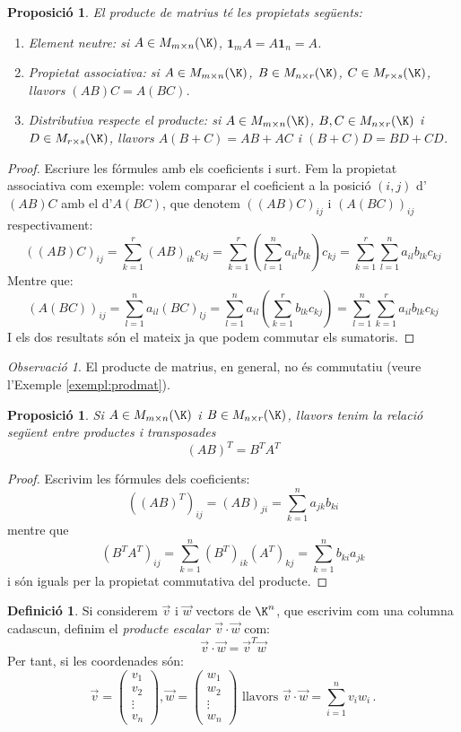 \documentclass[a4paper,12pt,twoside]{article}
\newcommand{\1}{\mathbf{1}}
\newcommand{\0}{\mathbf{0}}
\newtheorem{proposicio}[teorema]{Proposició}
\theoremstyle{definition}
\newtheorem{definicio}[teorema]{Definició}
\theoremstyle{remark}
\newtheorem{observacio}[teorema]{Observació}
\begin{document}
\begin{proposicio}
	El producte de matrius té les propietats següents:
	\begin{enumerate}[\rm (a)]
		\item Element neutre: si $A \in M_{m\times n}(\K)$, $\1_m A = A \1_n = A$.
		\item Propietat associativa: si $A \in M_{m\times n}(\K)$, $B \in M_{n\times r}(\K)$, $C \in M_{r\times s}(\K)$, llavors $(AB)C=A(BC)$.
		\item Distributiva respecte el producte: si $A \in M_{m\times n}(\K)$, $B, C \in M_{n\times r}(\K)$ i $D \in M_{r\times s}(\K)$, llavors $A(B+C)=AB+AC$ i $(B+C)D=BD+CD$.
	\end{enumerate}
\end{proposicio}
\begin{proof}
	Escriure les fórmules amb els coeficients i surt. Fem la propietat associativa com exemple: volem comparar el coeficient a la posició $(i,j)$ d'$(AB)C$ amb el d'$A(BC)$, que denotem $((AB)C)_{ij}$ i $(A(BC))_{ij}$ respectivament:
	$$
	((AB)C)_{ij}=\sum_{k=1}^r(AB)_{ik}c_{kj}=\sum_{k=1}^r(\sum_{l=1}^na_{il}b_{lk})c_{kj}=\sum_{k=1}^r\sum_{l=1}^na_{il}b_{lk}c_{kj}
	$$
	Mentre que:
	$$
	(A(BC))_{ij}=\sum_{l=1}^na_{il}(BC)_{lj}=\sum_{l=1}^na_{il}(\sum_{k=1}^rb_{lk}c_{kj})=\sum_{l=1}^n\sum_{k=1}^ra_{il}b_{lk}c_{kj}
	$$
	I els dos resultats són el mateix ja que podem commutar els sumatoris.
\end{proof}
\begin{observacio}
	El producte de matrius, en general, no és commutatiu (veure l'Exemple \ref{exempl:prodmat}).
\end{observacio}
\begin{proposicio}
	Si $A\in M_{m\times n}(\K)$ i $B\in M_{n\times r}(\K)$, llavors tenim la relació següent entre productes i transposades
	$$
	(AB)^T=B^T A^T
	$$
\end{proposicio}
\begin{proof}
	Escrivim les fórmules dels coeficients:
	$$
	((AB)^T)_{ij}=(AB)_{ji}=\sum_{k=1}^n a_{jk}b_{ki}
	$$
	mentre que
	$$
	(B^TA^T)_{ij}=\sum_{k=1}^n (B^T)_{ik}(A^T)_{kj}=\sum_{k=1}^n b_{ki}a_{jk}
	$$
	i són iguals per la propietat commutativa del producte.
\end{proof}
\begin{definicio}
	Si considerem $\vec{v}$ i $\vec{w}$ vectors de $\K^n$, que escrivim com una columna cadascun, definim el \emph{producte escalar $\vec{v}\cdot\vec{w}$} com:
	$$
	\vec{v}\cdot \vec{w}=\vec{v}^T \vec{w}
	$$
	Per tant, si les coordenades són:
	$$
	\vec{v}=\begin{pmatrix}
	v_1 \\ v_2 \\ \vdots \\ v_n 
	\end{pmatrix}, 
	\vec{w}=\begin{pmatrix}
	w_1 \\ w_2 \\ \vdots \\ w_n 
	\end{pmatrix}
	\text{ llavors }
	\vec{v}\cdot\vec{w}=\sum_{i=1}^n v_iw_i \,.
	$$
\end{definicio}
\end{document}
